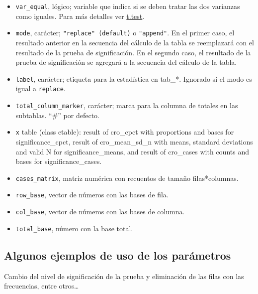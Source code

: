 \documentclass[
]{book}
\begin{document}
\begin{itemize}
\item
  \texttt{var\_equal}, lógico; variable que indica si se deben tratar las dos varianzas como iguales. Para más detalles ver \href{https://www.rdocumentation.org/packages/stats/versions/3.6.2/topics/t.test}{t.test}.
\item
  \texttt{mode}, carácter; \texttt{"replace"\ (default)} o \texttt{"append"}. En el primer caso, el resultado anterior en la secuencia del cálculo de la tabla se reemplazará con el resultado de la prueba de significación. En el segundo caso, el resultado de la prueba de significación se agregará a la secuencia del cálculo de la tabla.
\item
  \texttt{label}, carácter; etiqueta para la estadística en tab\_*. Ignorado si el modo es igual a \texttt{replace}.
\item
  \texttt{total\_column\_marker}, carácter; marca para la columna de totales en las subtablas. ``\#'' por defecto.
\item
  \texttt{x} table (class etable): result of cro\_cpct with proportions and bases for significance\_cpct, result of cro\_mean\_sd\_n with means, standard deviations and valid N for significance\_means, and result of cro\_cases with counts and bases for significance\_cases.
\item
  \texttt{cases\_matrix}, matriz numérica con recuentos de tamaño filas*columnas.
\item
  \texttt{row\_base}, vector de números con las bases de fila.
\item
  \texttt{col\_base}, vector de números con las bases de columna.
\item
  \texttt{total\_base}, número con la base total.
\end{itemize}

\hypertarget{algunos-ejemplos-de-uso-de-los-paruxe1metros}{%
\subsection{Algunos ejemplos de uso de los parámetros}\label{algunos-ejemplos-de-uso-de-los-paruxe1metros}}

Cambio del nivel de significación de la prueba y eliminación de las filas con las frecuencias, entre otros\ldots{}
\end{document}
